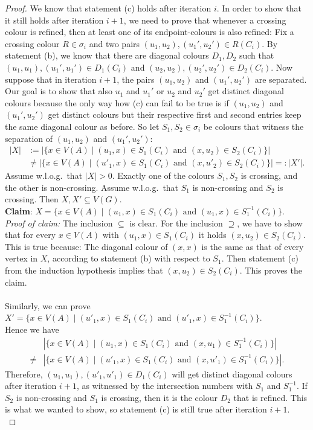 \documentclass[a4paper,UKenglish,cleveref, autoref, thm-restate]{lipics-v2021}
\begin{document}
\begin{proof}
			We know that statement (c) holds after iteration $i$. In order to show that it still holds after iteration $i+1$, we need to prove that whenever a crossing colour is refined, then at least one of its endpoint-colours is also refined: Fix a crossing colour $R \in \sigma_i$ and two pairs $(u_1,u_2), (u_1',u_2') \in R(C_i)$. By statement (b), we know that there are diagonal colours $D_1, D_2$ such that $(u_1,u_1), (u_1',u_1') \in D_1(C_i)$ and $(u_2,u_2), (u_2',u_2') \in D_2(C_i)$. Now suppose that in iteration $i+1$, the pairs $(u_1,u_2)$ and $(u_1',u_2')$ are separated. Our goal is to show that also $u_1$ and $u_1'$ or $u_2$ and $u_2'$ get distinct diagonal colours because the only way how (c) can fail to be true is if $(u_1,u_2)$ and $(u_1',u_2')$ get distinct colours but their respective first and second entries keep the same diagonal colour as before. 
			So let $S_1, S_2 \in \sigma_i$ be colours that witness the separation of $(u_1,u_2)$ and $(u_1',u_2')$:  	
			\begin{align*}
				|X | &:= |\{ x \in V(A) \mid (u_1,x) \in S_1(C_i) \text{ and } (x,u_2) \in S_2(C_i)  \}|\\
				& \neq |\{ x \in V(A) \mid (u'_1,x) \in S_1(C_i) \text{ and } (x,u'_2) \in S_2(C_i) \}| =: | X' | .
			\end{align*}
			Assume w.l.o.g.\ that $|X| > 0$. Exactly one of the colours $S_1, S_2$ is crossing, and the other is non-crossing. Assume w.l.o.g.\ that $S_1$ is non-crossing and $S_2$ is crossing. Then $X,X' \subseteq V(G).$\\
			\textbf{Claim}: $X = \{ x \in V(A) \mid (u_1,x) \in S_1(C_i) \text{ and } (u_1,x) \in S_1^{-1}(C_i)  \}$.\\
			\textit{Proof of claim:} The inclusion $\subseteq$ is clear. For the inclusion $\supseteq$, we have to show that for every $x \in V(A)$ with $(u_1,x) \in S_1(C_i)$ it holds $(x,u_2) \in S_2(C_i)$. This is true because: The diagonal colour of $(x,x)$ is the same as that of every vertex in $X$, according to statement (b) with respect to $S_1$. Then statement (c) from the induction hypothesis implies that $(x,u_2) \in S_2(C_i)$. This proves the claim.\\
			\\
			Similarly, we can prove $X' = \{ x \in V(A) \mid (u'_1,x) \in S_1(C_i) \text{ and } (u'_1,x) \in S_1^{-1}(C_i)  \}$.\\
			Hence we have
			\begin{align*}
				& |\{ x \in V(A) \mid (u_1,x) \in S_1(C_i) \text{ and } (x,u_1) \in S_1^{-1}(C_i)  \}|\\
				\neq &|\{ x \in V(A) \mid (u'_1,x) \in S_1(C_i) \text{ and } (x,u'_1) \in S_1^{-1}(C_i) \}|.
			\end{align*}
			Therefore, $(u_1,u_1), (u'_1,u'_1) \in D_1(C_i)$ will get distinct diagonal colours after iteration $i+1$, as witnessed by the intersection numbers with $S_1$ and $S_1^{-1}$. If $S_2$ is non-crossing and $S_1$ is crossing, then it is the colour $D_2$ that is refined. This is what we wanted to show, so statement (c) is still true after iteration $i+1$.\\
			

\end{proof}
\end{document}
